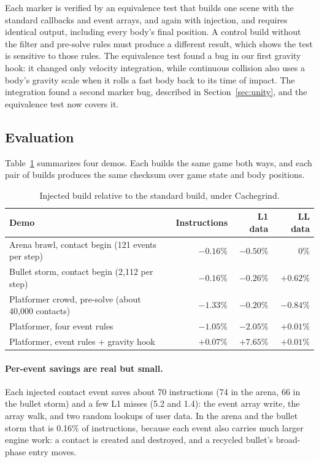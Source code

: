 \documentclass[11pt]{article}
\newcommand{\code}[1]{\texttt{\detokenize{#1}}}
\begin{document}
Each marker is verified by an equivalence test that builds one scene with the standard callbacks
and event arrays, and again with injection, and requires identical output, including every body's
final position. A control build without the filter and pre-solve rules must produce a different
result, which shows the test is sensitive to those rules. The equivalence test found a bug in our
first gravity hook: it changed only velocity integration, while continuous collision also uses a
body's gravity scale when it rolls a fast body back to its time of impact. The \code{unity_pack}
integration found a second marker bug, described in Section~\ref{sec:unity}, and the equivalence
test now covers it.

\subsection{Evaluation}

Table~\ref{tab:inject} summarizes four demos. Each builds the same game both ways, and each pair of
builds produces the same checksum over game state and body positions.

\begin{table}[ht]
\centering
\caption{Injected build relative to the standard build, under Cachegrind.}
\label{tab:inject}
\begin{tabular}{lrrr}
\toprule
Demo & Instructions & L1 data & LL data \\
\midrule
Arena brawl, contact begin (121 events per step) & $-0.16\%$ & $-0.50\%$ & $0\%$ \\
Bullet storm, contact begin (2{,}112 per step) & $-0.16\%$ & $-0.26\%$ & $+0.62\%$ \\
Platformer crowd, pre-solve (about 40{,}000 contacts) & $-1.33\%$ & $-0.20\%$ & $-0.84\%$ \\
Platformer, four event rules & $-1.05\%$ & $-2.05\%$ & $+0.01\%$ \\
Platformer, event rules + gravity hook & $+0.07\%$ & $+7.65\%$ & $+0.01\%$ \\
\bottomrule
\end{tabular}
\end{table}

\paragraph{Per-event savings are real but small.} Each injected contact event saves about 70
instructions (74 in the arena, 66 in the bullet storm) and a few L1 misses (5.2 and 1.4): the event
array write, the array walk, and two random lookups of user data. In the arena and the bullet storm that is 0.16\% of instructions, because each event
also carries much larger engine work: a contact is created and destroyed, and a recycled bullet's
broad-phase entry moves.
\end{document}
